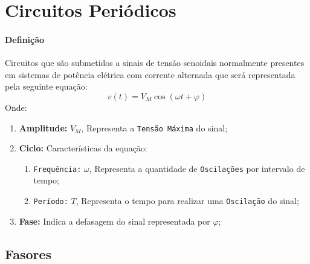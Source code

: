\documentclass{article}
\begin{document}
    \section{Circuitos Periódicos}
        \paragraph{Definição}Circuitos que são submetidos a sinais de tensão senoidais normalmente presentes em sistemas de potência elétrica com corrente alternada que será representada pela seguinte equação:
            \begin{equation}
                \boxed{v(t) = V_{M}\cos(\omega t + \varphi)}
            \end{equation}
        Onde:
            \begin{enumerate}
                \item \textbf{Amplitude:} $V_{M}$, Representa a \texttt{Tensão Máxima} do sinal;

                \item \textbf{Ciclo:} Características da equação:
                    \begin{enumerate}[noitemsep, rightmargin = \leftmargin]
                        \item \texttt{Frequência:} $\omega$, Representa a quantidade de \texttt{Oscilações} por intervalo de tempo;

                        \item \texttt{Período:} $T$, Representa o tempo para realizar uma \texttt{Oscilação} do sinal;
                    \end{enumerate}

                \item \textbf{Fase:} Indica a defasagem do sinal representada por $\varphi$;
            \end{enumerate}

        \subsection{Fasores}
\end{document}
